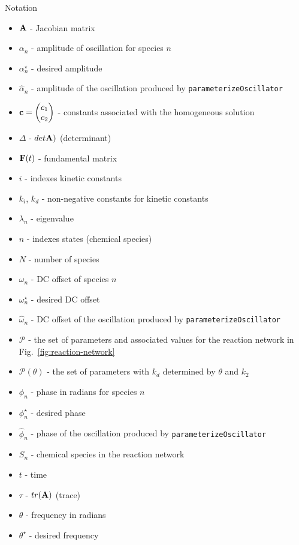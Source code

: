 \documentclass{bmcart}
\newcommand{\fig}[1]{Fig.~\ref{#1}}
\begin{document}
\begin{backmatter}
Notation
\begin{itemize}
\item ${\bf A}$ - Jacobian matrix
\item $\alpha_n$ - amplitude of oscillation for species $n$
\item $\alpha_n^{\star}$ - desired amplitude
\item $\hat{\alpha}_n$ - amplitude of the oscillation produced by {\tt parameterizeOscillator}
\item ${\bf c} = \begin{pmatrix} c_1 \\ c_2 \end{pmatrix}$ - constants associated with the homogeneous solution
\item $\Delta$ -
$det {\bf A})$ (determinant)
\item  ${\bf F} (t)$ - fundamental matrix
\item $i$ - indexes kinetic constants
\item $k_i$, $k_d$ -
non-negative constants for kinetic constants
\item $\lambda_n$ -
eigenvalue
\item $n$ - indexes states (chemical species)
\item $N$ - number of species
\item $\omega_n$ - DC offset of species $n$
\item $\omega_n^{\star}$ - desired DC offset
\item $\hat{\omega}_n$ - DC offset of the oscillation produced by {\tt parameterizeOscillator}
\item $\mathcal{P}$ - the set of parameters and associated values for the reaction network in \fig{fig:reaction-network}
\item $\mathcal{P} (\theta)$ - the set of parameters with $k_d$ determined by $\theta$ and $k_2$
\item $\phi_n$ - phase in radians for species $n$
\item $\phi_n^{\star}$ - desired phase
\item $\hat{\phi}_n$ - phase of the oscillation produced by {\tt parameterizeOscillator}
\item $S_n$ - chemical species in the reaction network
\item $t$ - time 
\item $\tau$ - $tr({\bf A})$ (trace)
\item $\theta$ - frequency in
radians
\item $\theta^{\star}$ - desired frequency

\end{itemize}
\end{backmatter}
\end{document}
